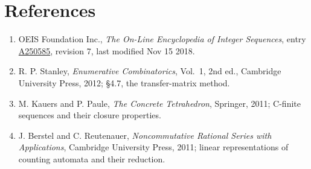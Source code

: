 \documentclass[11pt]{article}
\theoremstyle{definition}
\begin{document}
\section{References}

\begin{enumerate}

\item OEIS Foundation Inc., \emph{The On-Line Encyclopedia of Integer Sequences}, entry \href{https://oeis.org/A250585}{A250585}, revision 7, last modified Nov 15 2018.

\item R. P. Stanley, \emph{Enumerative Combinatorics}, Vol.~1, 2nd ed., Cambridge University Press, 2012; \S4.7, the transfer-matrix method.

\item M. Kauers and P. Paule, \emph{The Concrete Tetrahedron}, Springer, 2011; C-finite sequences and their closure properties.

\item J. Berstel and C. Reutenauer, \emph{Noncommutative Rational Series with Applications}, Cambridge University Press, 2011; linear representations of counting automata and their reduction.

\end{enumerate}
\end{document}
